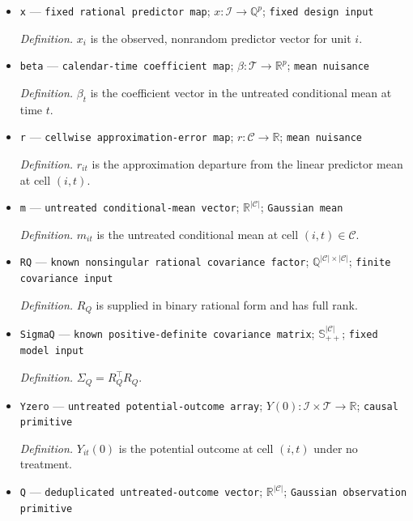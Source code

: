 \documentclass{article}
\begin{document}
\begin{itemize}
  \par\smallskip\noindent\emph{Definition.} \(\mathcal C=\{(j,T_j+h):(j,h)\in\mathcal E\}\cup\{(i,T_j+h):(j,h)\in\mathcal E,\ i\in D_{jh}\}\), with repeated cells retained once.
  \item \texttt{x} --- \texttt{fixed rational predictor map}; \(x:\mathcal I\to\mathbb Q^p\); \texttt{fixed design input}
  \par\smallskip\noindent\emph{Definition.} \(x_i\) is the observed, nonrandom predictor vector for unit \(i\).
  \item \texttt{beta} --- \texttt{calendar-\allowbreak{}time coefficient map}; \(\beta:\mathcal T\to\mathbb R^p\); \texttt{mean nuisance}
  \par\smallskip\noindent\emph{Definition.} \(\beta_t\) is the coefficient vector in the untreated conditional mean at time \(t\).
  \item \texttt{r} --- \texttt{cellwise approximation-\allowbreak{}error map}; \(r:\mathcal C\to\mathbb R\); \texttt{mean nuisance}
  \par\smallskip\noindent\emph{Definition.} \(r_{it}\) is the approximation departure from the linear predictor mean at cell \((i,t)\).
  \item \texttt{m} --- \texttt{untreated conditional-\allowbreak{}mean vector}; \(\mathbb R^{|\mathcal C|}\); \texttt{Gaussian mean}
  \par\smallskip\noindent\emph{Definition.} \(m_{it}\) is the untreated conditional mean at cell \((i,t)\in\mathcal C\).
  \item \texttt{RQ} --- \texttt{known nonsingular rational covariance factor}; \(\mathbb Q^{|\mathcal C|\times|\mathcal C|}\); \texttt{finite covariance input}
  \par\smallskip\noindent\emph{Definition.} \(R_Q\) is supplied in binary rational form and has full rank.
  \item \texttt{SigmaQ} --- \texttt{known positive-\allowbreak{}definite covariance matrix}; \(\mathbb S_{++}^{|\mathcal C|}\); \texttt{fixed model input}
  \par\smallskip\noindent\emph{Definition.} \(\Sigma_Q=R_Q^{\top}R_Q\).
  \item \texttt{Yzero} --- \texttt{untreated potential-\allowbreak{}outcome array}; \(Y(0):\mathcal I\times\mathcal T\to\mathbb R\); \texttt{causal primitive}
  \par\smallskip\noindent\emph{Definition.} \(Y_{it}(0)\) is the potential outcome at cell \((i,t)\) under no treatment.
  \item \texttt{Q} --- \texttt{deduplicated untreated-\allowbreak{}outcome vector}; \(\mathbb R^{|\mathcal C|}\); \texttt{Gaussian observation primitive}

\end{itemize}
\end{document}
